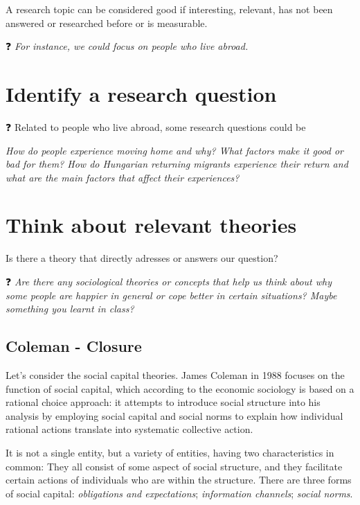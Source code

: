 \documentclass[
  notitlepage,
  onecolumn,
  openany]{book}
\begin{document}
A research topic can be considered good if interesting, relevant, has not been answered or researched before or is measurable.

❓ \emph{For instance, we could focus on people who live abroad.}

\hypertarget{identify-a-research-question}{%
\section{Identify a research question}\label{identify-a-research-question}}

❓ Related to people who live abroad, some research questions could be

\emph{How do people experience moving home and why? What factors make it good or bad for them? How do Hungarian returning migrants experience their return and what are the main factors that affect their experiences?}

\hypertarget{think-about-relevant-theories}{%
\section{Think about relevant theories}\label{think-about-relevant-theories}}

Is there a theory that directly adresses or answers our question?

❓ \emph{Are there any sociological theories or concepts that help us think about why some people are happier in general or cope better in certain situations? Maybe something you learnt in class?}

\hypertarget{coleman---closure}{%
\subsection{Coleman - Closure}\label{coleman---closure}}

Let's consider the social capital theories. James Coleman in 1988 focuses on the function of social capital, which according to the economic sociology is based on a rational choice approach: it attempts to introduce social structure into his analysis by employing social capital and social norms to explain how individual rational actions translate into systematic collective action.

It is not a single entity, but a variety of entities, having two characteristics in common: They all consist of some aspect of social structure, and they facilitate certain actions of individuals who are within the structure. There are three forms of social capital: \emph{obligations and expectations}; \emph{information channels}; \emph{social norms}.
\end{document}
